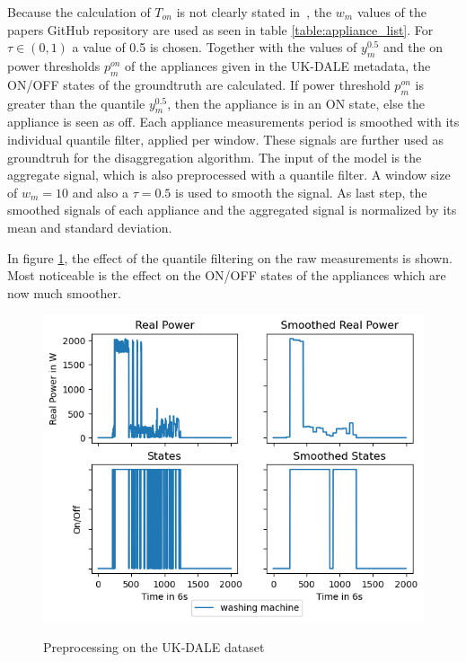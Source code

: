 \documentclass[sigconf]{acmart}
\begin{document}
Because the calculation of $T_{on}$ is not clearly stated in~\cite{unetnilm}, the $w_m$ values of the papers GitHub repository are used as seen in table \ref{table:appliance_list}.
For $\tau \in (0,1)$ a value of 0.5 is chosen. 
Together with the values of $y^{0.5}_m$ and the on power thresholds $p^{on}_m$ of the appliances given in the UK-DALE metadata, the ON/OFF states of the groundtruth are calculated.
If power threshold $p^{on}_m $ is greater than the quantile $y^{0.5}_m$, then the appliance is in an ON state, else the appliance is seen as off.
Each appliance measurements period is smoothed with its individual quantile filter, applied per window.
These signals are further used as groundtruh for the disaggregation algorithm.
The input of the model is the aggregate signal, which is also preprocessed with a quantile filter.
A window size of $w_m=10$ and also a $\tau=0.5$ is used to smooth the signal. 
As last step, the smoothed signals of each appliance and the aggregated signal is normalized by its mean and standard deviation.

In figure \ref{fig:preprocessing}, the effect of the quantile filtering on the raw measurements is shown. 
Most noticeable is the effect on the ON/OFF states of the appliances which are now much smoother.

\begin{figure}
  \caption{Preprocessing on the UK-DALE dataset}
  \includegraphics[scale=0.55]{figures/window2.png}
  \label{fig:preprocessing}
\end{figure}
\end{document}
